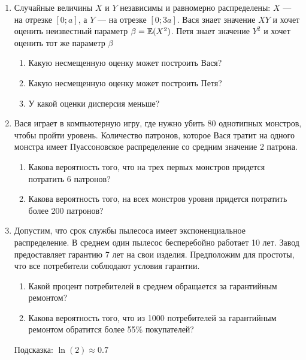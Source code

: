 \begin{enumerate}

\item Случайные величины $X$ и $Y$ независимы и равномерно распределены: $X$ — на отрезке $[0;a]$, а $Y$ — на отрезке $[0;3a]$.
Вася знает значение $XY$ и хочет оценить неизвестный параметр $\beta=\mathbb{E}(X^{2})$.
Петя знает значение $Y^2$ и хочет оценить тот же параметр $\beta$
\begin{enumerate}
\item Какую несмещенную оценку может построить Вася?
\item Какую несмещенную оценку может построить Петя?
\item У какой оценки дисперсия меньше?
\end{enumerate}


\item Вася играет в компьютерную игру, где нужно убить 80 однотипных монстров, чтобы пройти уровень. Количество патронов, которое Вася тратит на одного монстра имеет Пуассоновское распределение со средним значение 2 патрона.
\begin{enumerate}
\item Какова вероятность того, что на трех первых монстров придется потратить 6 патронов?
\item Какова вероятность того, на всех монстров уровня придется потратить более 200 патронов?
\end{enumerate}

\item Допустим, что срок службы пылесоса имеет экспоненциальное распределение. В среднем один пылесос бесперебойно работает 10 лет. Завод предоставляет гарантию 7 лет на свои изделия. Предположим для простоты, что все потребители соблюдают условия гарантии.
\begin{enumerate}
\item Какой процент потребителей в среднем обращается за гарантийным ремонтом?
\item Какова вероятность того, что из 1000 потребителей за гарантийным ремонтом обратится более 55\% покупателей?
\end{enumerate}
Подсказка: $\ln(2)\approx 0.7$


\end{enumerate}
